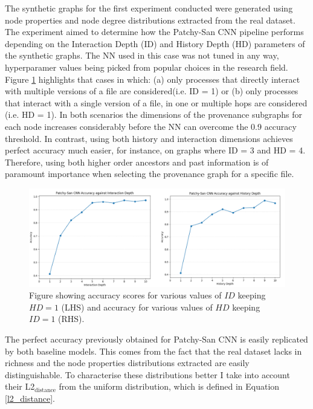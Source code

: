 The synthetic graphs for the first experiment conducted were generated using node properties and node degree distributions extracted from the real dataset. The experiment aimed to determine how the Patchy-San CNN pipeline performs depending on the Interaction Depth (ID) and History Depth (HD) parameters of the synthetic graphs. The NN used in this case was not tuned in any way, hyperparamer values being picked from popular choices in the research field. Figure \ref{inter_hist_depth_acc} highlights that cases in which: 
(a) only processes that directly interact with multiple versions of a file are considered(i.e. ID = 1) or (b) only processes that interact with a single version of a file, in one or multiple hops are considered (i.e. HD = 1). In both scenarios the dimensions of the provenance subgraphs for each node increases considerably before the NN can overcome the 0.9 accuracy threshold. In contrast, using both history and interaction dimensions achieves perfect accuracy much easier, for instance, on graphs where ID = 3 and HD = 4. Therefore, using both higher order ancestors and past information is of paramount importance when selecting the provenance graph for a specific file. \\


\begin{figure}[H]
  \centering
  \centerline{\includegraphics[scale=0.475]{Images/inter_hist_deph_acc.png}}
  \caption{ Figure showing accuracy scores for various values of $ID$ keeping $HD = 1$ (LHS) and
    accuracy for various values of $HD$ keeping $ID = 1$ (RHS).}
  \label{inter_hist_depth_acc}
\end{figure}

The perfect accuracy previously obtained for Patchy-San CNN is easily replicated by both baseline models. This comes from the fact that the real dataset lacks in richness and the node properties distributions extracted are easily distinguishable. To characterise these distributions better I take into account their L2$_{\text{distance}}$ from the uniform distribution, which is defined in Equation \ref{l2_distance}.  

